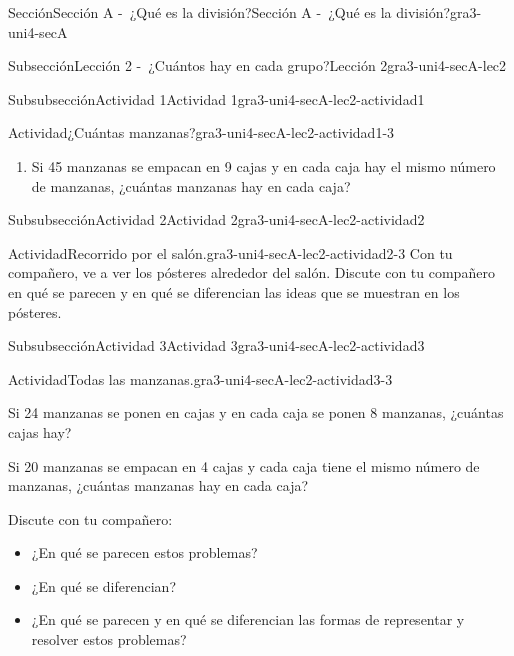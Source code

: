 \documentclass[twoside,10pt,]{article}
\begin{document}
\begin{sectionptx}{Sección}{Sección A -~¿Qué es la división?}{}{Sección A -~¿Qué es la división?}{}{}{gra3-uni4-secA}
\begin{subsectionptx}{Subsección}{Lección 2 -~¿Cuántos hay en cada grupo?}{}{Lección 2}{}{}{gra3-uni4-secA-lec2}
\begin{subsubsectionptx}{Subsubsección}{Actividad 1}{}{Actividad 1}{}{}{gra3-uni4-secA-lec2-actividad1}
\begin{activity}{Actividad}{¿Cuántas manzanas?}{gra3-uni4-secA-lec2-actividad1-3}
\begin{enumerate}
\item{}Si 45 manzanas se empacan en 9 cajas y en cada caja hay el mismo número de manzanas, ¿cuántas manzanas hay en cada caja?%
\end{enumerate}
%
\end{activity}%
\end{subsubsectionptx}
%
%
\typeout{************************************************}
\typeout{************************************************}
%
\begin{subsubsectionptx}{Subsubsección}{Actividad 2}{}{Actividad 2}{}{}{gra3-uni4-secA-lec2-actividad2}
\begin{activity}{Actividad}{Recorrido por el salón.}{gra3-uni4-secA-lec2-actividad2-3}%
Con tu compañero, ve a ver los pósteres alrededor del salón. Discute con tu compañero en qué se parecen y en qué se diferencian las ideas que se muestran en los pósteres.%
\end{activity}%
\end{subsubsectionptx}
%
%
\typeout{************************************************}
\typeout{************************************************}
%
\begin{subsubsectionptx}{Subsubsección}{Actividad 3}{}{Actividad 3}{}{}{gra3-uni4-secA-lec2-actividad3}
\begin{activity}{Actividad}{Todas las manzanas.}{gra3-uni4-secA-lec2-actividad3-3}%
\begin{sidebyside}{2}{0.05}{0.05}{0.1}%
\begin{sbspanel}{0.4}%
Si 24 manzanas se ponen en cajas y en cada caja se ponen 8 manzanas, ¿cuántas cajas hay?%
\end{sbspanel}%
\begin{sbspanel}{0.4}%
\par
Si 20 manzanas se empacan en 4 cajas y cada caja tiene el mismo número de manzanas, ¿cuántas manzanas hay en cada caja?%
\end{sbspanel}%
\end{sidebyside}%
\par
Discute con tu compañero:%
\par
%
\begin{itemize}[label=\textbullet]
\item{}¿En qué se parecen estos problemas?%
\item{}¿En qué se diferencian?%
\item{}¿En qué se parecen y en qué se diferencian las formas de representar y resolver estos problemas?%

\end{itemize}
\end{activity}
\end{subsubsectionptx}
\end{subsectionptx}
\end{sectionptx}
\end{document}

